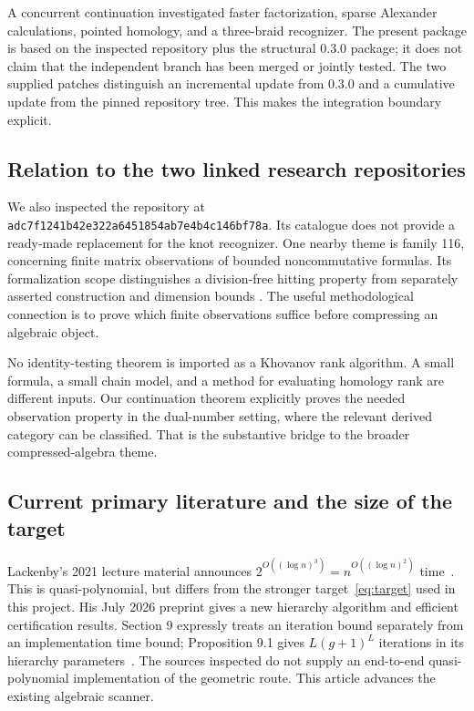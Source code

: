 A concurrent continuation investigated faster factorization, sparse
Alexander calculations, pointed homology, and a three-braid recognizer. The
present package is based on the inspected repository plus the structural
0.3.0 package; it does not claim that the independent branch has been merged
or jointly tested. The two supplied patches distinguish an incremental update
from 0.3.0 and a cumulative update from the pinned repository tree. This makes
the integration boundary explicit.

\subsection{Relation to the two linked research repositories}
We also inspected the  repository at
\nolinkurl{adc7f1241b42e322a6451854ab7e4b4c146bf78a}. Its catalogue does not
provide a ready-made replacement for the knot recognizer. One nearby theme is
family 116, concerning finite matrix observations of bounded noncommutative
formulas. Its formalization scope distinguishes a division-free hitting
property from separately asserted construction and dimension bounds
\cite{openaimath}. The useful methodological connection is to prove which
finite observations suffice before compressing an algebraic object.

No identity-testing theorem is imported as a Khovanov rank algorithm. A
small formula, a small chain model, and a method for evaluating homology rank
are different inputs. Our continuation theorem explicitly proves the needed
observation property in the dual-number setting, where the relevant derived
category can be classified. That is the substantive bridge to the broader
compressed-algebra theme.

\subsection{Current primary literature and the size of the target}
Lackenby's 2021 lecture material announces
$2^{O((\log n)^3)}=n^{O((\log n)^2)}$ time~\cite{lackenbytalk}. This is
quasi-polynomial, but differs from the stronger target~\eqref{eq:target} used
in this project. His July 2026 preprint gives a new hierarchy algorithm and
efficient certification results. Section 9 expressly treats an iteration
bound separately from an implementation time bound; Proposition 9.1 gives
$L(g+1)^L$ iterations in its hierarchy parameters~\cite{lackenby2026}.
The sources inspected do not supply an end-to-end quasi-polynomial
implementation of the geometric route. This article advances the existing
algebraic scanner.


